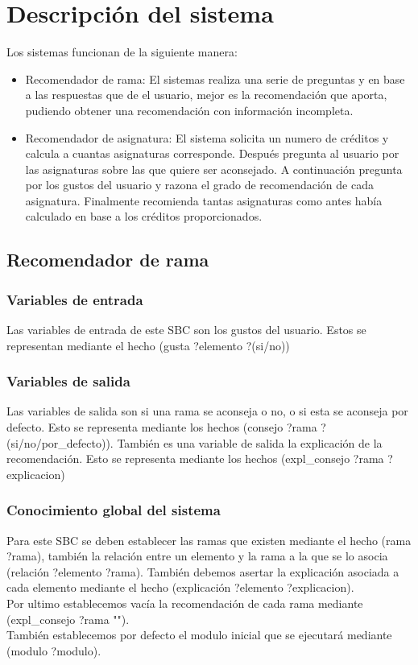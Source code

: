 \chapter{Descripción del sistema}
Los sistemas funcionan de la siguiente manera:
\begin{itemize}
   \item Recomendador de rama: El sistemas realiza una serie de preguntas y en base a las respuestas que de el usuario, mejor es la recomendación que aporta, pudiendo obtener una recomendación con información incompleta.
   \item Recomendador de asignatura: El sistema solicita un numero de créditos y calcula a cuantas asignaturas corresponde. Después pregunta al usuario por las asignaturas sobre las que quiere ser aconsejado. A continuación pregunta por los gustos del usuario y razona el grado de recomendación de cada asignatura. Finalmente recomienda tantas asignaturas como antes había calculado en base a los créditos proporcionados.
\end{itemize}
\section{Recomendador de rama}
\subsection{Variables de entrada}
Las variables de entrada de este SBC son los gustos del usuario. Estos se representan mediante el hecho (gusta ?elemento ?(si/no))
\subsection{Variables de salida}
Las variables de salida son si una rama se aconseja o no, o si esta se aconseja por defecto. Esto se representa mediante los hechos (consejo ?rama ?(si/no/por\_defecto)). También es una variable de salida la explicación de la recomendación. Esto se representa mediante los hechos (expl\_consejo ?rama ?explicacion)
\subsection{Conocimiento global del sistema}
Para este SBC se deben establecer las ramas que existen mediante el hecho (rama ?rama), también la relación entre un elemento y la rama a la que se lo asocia (relación ?elemento ?rama). También debemos asertar la explicación asociada a cada elemento mediante el hecho (explicación ?elemento ?explicacion).\\
Por ultimo establecemos vacía la recomendación de cada rama mediante (expl\_consejo ?rama "").\\
También establecemos por defecto el modulo inicial que se ejecutará mediante (modulo ?modulo).

